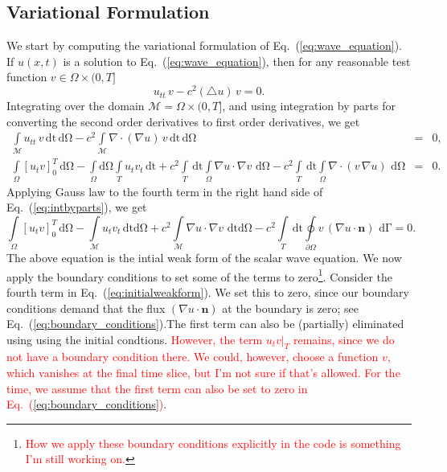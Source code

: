\documentclass[nofootinbib,preprintnumbers,superscriptaddress,notitlepage]{revtex4-1}
\newcommand{\<}{\begin{equation}}
\newcommand{\?}{\end{equation}}
\begin{document}
\subsection{Variational Formulation}

We start by computing the variational formulation of
Eq.~(\ref{eq:wave_equation}). If $u(x,t)$ is a solution to
Eq.~(\ref{eq:wave_equation}), then for any reasonable test function $v \in
\Omega \times (0, T]$
\begin{equation}
u_{tt}\,v - c^2 (\bigtriangleup u)\, v = 0.
\end{equation}
Integrating over the domain $\mathcal{M} = \Omega \times (0, T]$, and using
integration by parts for converting the second order derivatives to first
order derivatives, we get
\begin{eqnarray}
\int\limits_{\mathcal{M}} u_{tt}\,v \mathrm{\,dt\, d\Omega} 
- c^2 \int\limits_{\mathcal{M}} \nabla\cdot(\nabla u)\, v \mathrm{\,dt\, d\Omega} 
&=& 0,\\
\label{eq:intbyparts}
\int\limits_{\Omega}\left[u_t v \right]_{0}^{T}\,\mathrm{d\Omega}  
- \int\limits_{\Omega}\mathrm{d\Omega}\int\limits_{T} u_t v_t \mathrm{\,dt}
+ c^2\int\limits_{T}\,\mathrm{dt}\int\limits_{\Omega} \nabla u \cdot \nabla v \,\mathrm{\,d\Omega}
- c^2\int\limits_{T}\,\mathrm{dt}\int\limits_{\Omega} \nabla \cdot \left(v\,\nabla u\right) \,\mathrm{\,d\Omega}
&=& 0.
\end{eqnarray}
Applying Gauss law to the fourth term in the right hand side of Eq.~(\ref{eq:intbyparts}), we get
\begin{equation}
\label{eq:initialweakform}
\int\limits_{\Omega}\left[u_t v \right]_{0}^{T}\,\mathrm{d\Omega}  
- \int\limits_{\mathcal{M}} u_t v_t \mathrm{\,dtd\Omega}
+ c^2\int\limits_{\mathcal{M}} \nabla u \cdot \nabla v \,\mathrm{\,dt d\Omega}
- c^2\int\limits_{T}\,\mathrm{dt}\oint\limits_{\partial\Omega} v\, \left(\nabla u \cdot \mathbf{n}\right) \,\mathrm{\,d\Gamma}
= 0.
\end{equation}
The above equation is the intial weak form of the scalar wave equation. We now
apply the boundary conditions to set some of the terms to
zero\footnote{\textcolor{red}{How we apply these boundary conditions
explicitly in the code is something I'm still working on.}}. Consider the
fourth term in Eq.~(\ref{eq:initialweakform}). We set this to zero, since our
boundary conditions demand that the flux $(\nabla u \cdot \mathbf{n})$ at the
boundary is zero; see Eq.~(\ref{eq:boundary_conditions}).The first term can
also be (partially) eliminated using using the initial condtions.
\textcolor{red}{However, the term $u_t v |_{T}$ remains, since we do not have
a boundary condition there. We could, however, choose a function $v$, which
vanishes at the final time slice, but I'm not sure if that's allowed. For the
time, we assume that the first term can also be set to zero in
Eq.~(\ref{eq:boundary_conditions})}.\\
\end{document}
